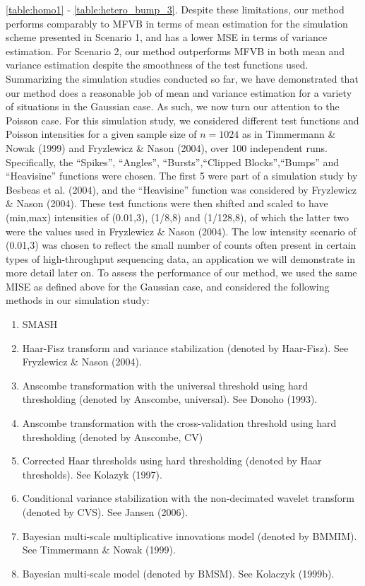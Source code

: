 \documentclass[12pt]{article}
\begin{document}
\ref{table:homo1} - \ref{table:hetero_bump_3}. Despite these limitations, our method performs comparably to MFVB in terms of mean estimation for the simulation scheme presented in Scenario 1, and has a lower MSE in terms of variance estimation. For Scenario 2, our method outperforms MFVB in both mean and variance estimation despite the smoothness of the test functions used. \bigskip\\
Summarizing the simulation studies conducted so far, we have demonstrated that our method does a reasonable job of mean and variance estimation for a variety of situations in the Gaussian case. As such, we now turn our attention to the Poisson case. For this simulation study, we considered different test functions and Poisson intensities for a given sample size of $n=1024$ as in Timmermann \& Nowak (1999) and Fryzlewicz \& Nason (2004), over 100 independent runs. Specifically, the ``Spikes'', ``Angles'', ``Bursts'',``Clipped Blocks'',``Bumps'' and ``Heavisine'' functions were chosen. The first 5 were part of a simulation study by Besbeas et al. (2004), and the ``Heavisine'' function was considered by Fryzlewicz \& Nason (2004). These test functions were then shifted and scaled to have (min,max) intensities of (0.01,3), (1/8,8) and (1/128,8), of which the latter two were the values used in Fryzlewicz \& Nason (2004). The low intensity scenario of (0.01,3) was chosen to reflect the small number of counts often present in certain types of high-throughput sequencing data, an application we will demonstrate in more detail later on. To assess the performance of our method, we used the same MISE as defined above for the Gaussian case, and considered the following methods in our simulation study:
\begin{enumerate}
\item SMASH
\item Haar-Fisz transform and variance stabilization (denoted by Haar-Fisz). See Fryzlewicz \& Nason (2004).
\item Anscombe transformation with the universal threshold using hard thresholding (denoted by Anscombe, universal). See Donoho (1993).
\item Anscombe transformation with the cross-validation threshold using hard thresholding (denoted by Anscombe, CV)
\item Corrected Haar thresholds using hard thresholding (denoted by Haar thresholds). See Kolazyk (1997).
\item Conditional variance stabilization with the non-decimated wavelet transform (denoted by CVS). See Jansen (2006).
\item Bayesian multi-scale multiplicative innovations model (denoted by BMMIM). See Timmermann \& Nowak (1999).
\item Bayesian multi-scale model (denoted by BMSM). See Kolaczyk (1999b).
\end{enumerate}
\end{document}
